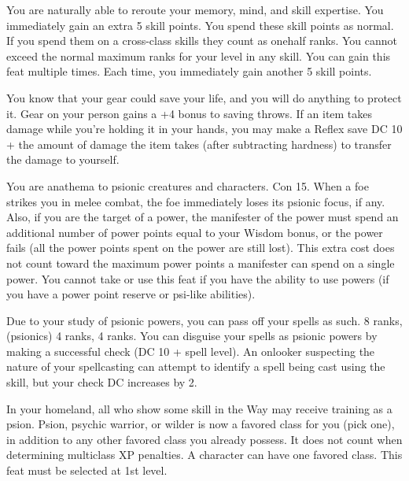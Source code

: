{You are naturally able to reroute your memory, mind, and skill expertise.}{}
{You immediately gain an extra 5 skill points. You spend these skill points as normal. If you spend them on a cross-class skills they count as onehalf ranks. You cannot exceed the normal maximum ranks for your level in any skill.}{}
{You can gain this feat multiple times. Each time, you immediately gain another 5 skill points.}

{You know that your gear could save your life, and you will do anything to protect it.}{}
{Gear on your person gains a +4 bonus to saving throws. If an item takes damage while you're holding it in your hands, you may make a Reflex save DC 10 + the amount of damage the item takes (after subtracting hardness) to transfer the damage to yourself.}{}{}

{You are anathema to psionic creatures and characters.}
{Con 15.}
{When a foe strikes you in melee combat, the foe immediately loses its psionic focus, if any. Also, if you are the target of a power, the manifester of the power must spend an additional number of power points equal to your Wisdom bonus, or the power fails (all the power points spent on the power are still lost). This extra cost does not count toward the maximum power points a manifester can spend on a single power.}{}
{You cannot take or use this feat if you have the ability to use powers (if you have a power point reserve or psi-like abilities).}

{Due to your study of psionic powers, you can pass off your spells as such.}
{ 8 ranks,  (psionics) 4 ranks,  4 ranks.}
{You can disguise your spells as psionic powers by making a successful  check (DC 10 + spell level). An onlooker suspecting the nature of your spellcasting can attempt to identify a spell being cast using the  skill, but your check DC increases by 2.}{}{}

{In your homeland, all who show some skill in the Way may receive training as a psion.}{}
{Psion, psychic warrior, or wilder is now a favored class for you (pick one), in addition to any other favored class you already possess. It does not count when determining multiclass XP penalties.}
{A character can have one favored class.}
{This feat must be selected at 1st level.}


